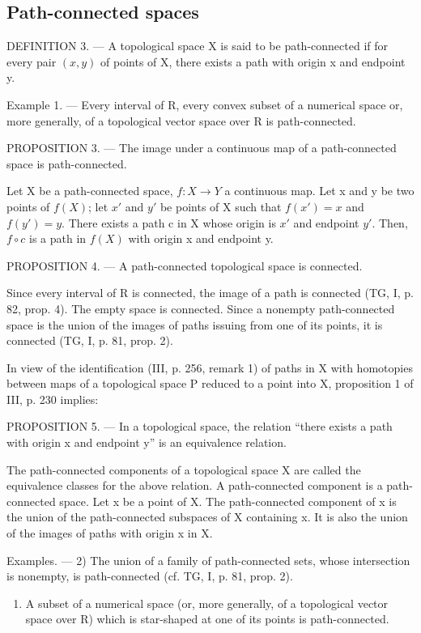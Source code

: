\subsection{Path-connected spaces}

DEFINITION 3. --- A topological space X is said to be path-connected if for every pair \((x,y)\) of points of X, there exists a path with origin x and endpoint y.

Example 1. --- Every interval of R, every convex subset of a numerical space or, more generally, of a topological vector space over R is path-connected.

PROPOSITION 3. --- The image under a continuous map of a path-connected space is path-connected.

Let X be a path-connected space, \(f: X \to Y\) a continuous map. Let x and y be two points of \(f(X)\); let \(x'\) and \(y'\) be points of X such that \(f(x') = x\) and \(f(y') = y\). There exists a path c in X whose origin is \(x'\) and endpoint \(y'\). Then, \(f \circ c\) is a path in \(f(X)\) with origin x and endpoint y.

PROPOSITION 4. --- A path-connected topological space is connected.

Since every interval of R is connected, the image of a path is connected (TG, I, p. 82, prop. 4). The empty space is connected. Since a nonempty path-connected space is the union of the images of paths issuing from one of its points, it is connected (TG, I, p. 81, prop. 2).

In view of the identification (III, p. 256, remark 1) of paths in X with homotopies between maps of a topological space P reduced to a point into X, proposition 1 of III, p. 230 implies:

PROPOSITION 5. --- In a topological space, the relation “there exists a path with origin x and endpoint y” is an equivalence relation.

The path-connected components of a topological space X are called the equivalence classes for the above relation. A path-connected component is a path-connected space. Let x be a point of X. The path-connected component of x is the union of the path-connected subspaces of X containing x. It is also the union of the images of paths with origin x in X.

Examples. --- 2) The union of a family of path-connected sets, whose intersection is nonempty, is path-connected (cf. TG, I, p. 81, prop. 2).

\begin{enumerate}
\def\labelenumi{\arabic{enumi})}
\setcounter{enumi}{2}
\tightlist
\item
  A subset of a numerical space (or, more generally, of a topological vector space over R) which is star-shaped at one of its points is path-connected.
\end{enumerate}

